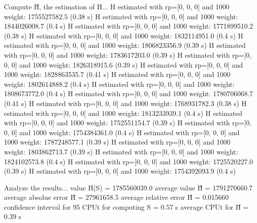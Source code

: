 Compute H̃, the estimation of H...
  H estimated with rp=[0, 0, 0] and 1000 weight:  1755527582.5  (0.38 s)
  H estimated with rp=[0, 0, 0] and 1000 weight:  1844026008.7  (0.4 s)
  H estimated with rp=[0, 0, 0] and 1000 weight:  1771899510.2  (0.38 s)
  H estimated with rp=[0, 0, 0] and 1000 weight:  1832114951.0  (0.4 s)
  H estimated with rp=[0, 0, 0] and 1000 weight:  1806823356.9  (0.39 s)
  H estimated with rp=[0, 0, 0] and 1000 weight:  1783617203.0  (0.39 s)
  H estimated with rp=[0, 0, 0] and 1000 weight:  1826318915.6  (0.39 s)
  H estimated with rp=[0, 0, 0] and 1000 weight:  1828863535.7  (0.41 s)
  H estimated with rp=[0, 0, 0] and 1000 weight:  1802614888.2  (0.4 s)
  H estimated with rp=[0, 0, 0] and 1000 weight:  1808673772.0  (0.4 s)
  H estimated with rp=[0, 0, 0] and 1000 weight:  1780706068.7  (0.41 s)
  H estimated with rp=[0, 0, 0] and 1000 weight:  1768931782.3  (0.38 s)
  H estimated with rp=[0, 0, 0] and 1000 weight:  1813233939.1  (0.4 s)
  H estimated with rp=[0, 0, 0] and 1000 weight:  1752551154.7  (0.39 s)
  H estimated with rp=[0, 0, 0] and 1000 weight:  1754384361.0  (0.4 s)
  H estimated with rp=[0, 0, 0] and 1000 weight:  1787248577.1  (0.39 s)
  H estimated with rp=[0, 0, 0] and 1000 weight:  1803862713.7  (0.39 s)
  H estimated with rp=[0, 0, 0] and 1000 weight:  1824102573.8  (0.4 s)
  H estimated with rp=[0, 0, 0] and 1000 weight:  1725520227.0  (0.39 s)
  H estimated with rp=[0, 0, 0] and 1000 weight:  1754392093.9  (0.4 s)

Analyze the results...
  value H(S)                  = 1785560039.0 
  average value H̃             = 1791270660.7 
  average absolue error H̃     = 27961658.5 
  average relative error H̃    = 0.015660 
  confidence interval for 95%
  CPUt for computing S         = 0.57 s
  average CPUt for H̃           = 0.39 s

